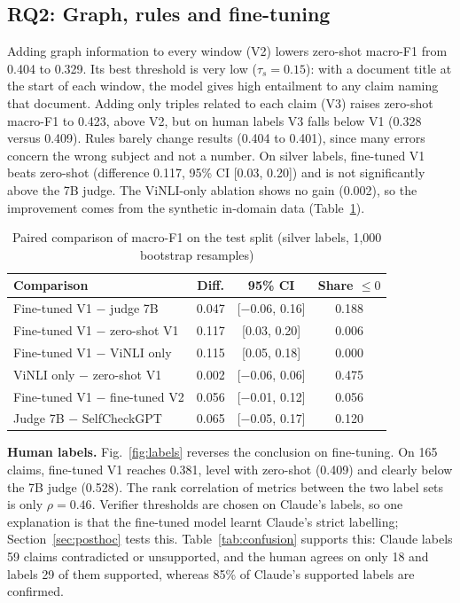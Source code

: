 \documentclass[conference]{IEEEtran}
\begin{document}
\subsection{RQ2: Graph, rules and fine-tuning}
Adding graph information to every window (V2) lowers zero-shot macro-F1 from 0.404 to 0.329. Its best threshold is very low ($\tau_s=0.15$): with a document title at the start of each window, the model gives high entailment to any claim naming that document. Adding only triples related to each claim (V3) raises zero-shot macro-F1 to 0.423, above V2, but on human labels V3 falls below V1 (0.328 versus 0.409). Rules barely change results (0.404 to 0.401), since many errors concern the wrong subject and not a number. On silver labels, fine-tuned V1 beats zero-shot (difference 0.117, 95\% CI [0.03, 0.20]) and is not significantly above the 7B judge. The ViNLI-only ablation shows no gain (0.002), so the improvement comes from the synthetic in-domain data (Table~\ref{tab:paired}).

\begin{table}[t]
\caption{Paired comparison of macro-F1 on the test split (silver labels, 1,000 bootstrap resamples)}
\label{tab:paired}
\centering
\footnotesize
\begin{tabular}{p{}ccc}
\toprule
Comparison & Diff. & 95\% CI & Share $\le 0$ \\
\midrule
Fine-tuned V1 $-$ judge 7B & 0.047 & [$-$0.06, 0.16] & 0.188 \\
Fine-tuned V1 $-$ zero-shot V1 & 0.117 & [0.03, 0.20] & 0.006 \\
Fine-tuned V1 $-$ ViNLI only & 0.115 & [0.05, 0.18] & 0.000 \\
ViNLI only $-$ zero-shot V1 & 0.002 & [$-$0.06, 0.06] & 0.475 \\
Fine-tuned V1 $-$ fine-tuned V2 & 0.056 & [$-$0.01, 0.12] & 0.056 \\
Judge 7B $-$ SelfCheckGPT & 0.065 & [$-$0.05, 0.17] & 0.120 \\
\bottomrule
\end{tabular}
\end{table}

\textbf{Human labels.} Fig.~\ref{fig:labels} reverses the conclusion on fine-tuning. On 165 claims, fine-tuned V1 reaches 0.381, level with zero-shot (0.409) and clearly below the 7B judge (0.528). The rank correlation of metrics between the two label sets is only $\rho=0.46$. Verifier thresholds are chosen on Claude's labels, so one explanation is that the fine-tuned model learnt Claude's strict labelling; Section~\ref{sec:posthoc} tests this. Table~\ref{tab:confusion} supports this: Claude labels 59 claims contradicted or unsupported, and the human agrees on only 18 and labels 29 of them supported, whereas 85\% of Claude's supported labels are confirmed.
\end{document}
